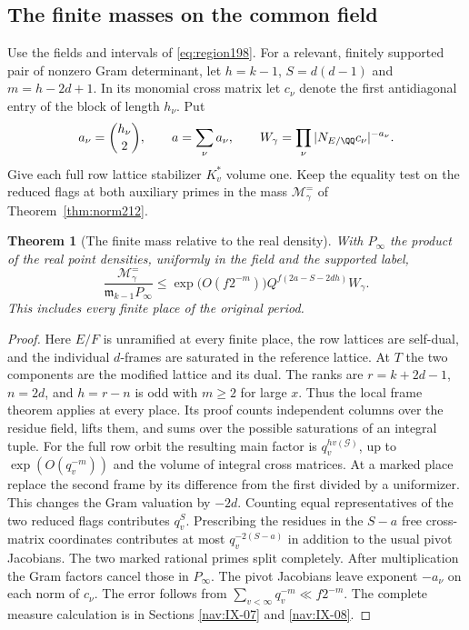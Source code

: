\documentclass[a4paper,11pt]{article}
\newtheorem{theorem}[proposition]{Theorem}
\theoremstyle{definition}
\theoremstyle{remark}
\numberwithin{equation}{section}
\begin{document}
\subsection{The finite masses on the common field}\label{nav:IX-23}
Use the fields and intervals of \eqref{eq:region198}. For a
relevant, finitely supported pair of nonzero Gram determinant,
let \(h=k-1\), \(S=d(d-1)\) and \(m=h-2d+1\). In its monomial
cross matrix let \(c_\nu\) denote the first antidiagonal
entry of the block of length \(h_\nu\). Put
\[
 a_\nu=\binom{h_\nu}{2},\qquad a=\sum_\nu a_\nu,\qquad
 W_\gamma=\prod_\nu |N_{E/\QQ}c_\nu|^{-a_\nu}.
\]
Give each full row lattice stabilizer \(K_v^*\) volume one. Keep
the equality test on the reduced flags at both auxiliary primes
in the mass \(\mathcal M_\gamma^{=}\) of
Theorem~\ref{thm:norm212}.

\begin{theorem}[The finite mass relative to the real density]
\label{thm:finite216}
With \(P_\infty\) the product of the real point densities,
uniformly in the field and the supported label,
\[
 \frac{\mathcal M_\gamma^{=}}{\mathfrak m_{k-1}P_\infty}
   \le \exp\bigl(O(f2^{-m})\bigr)
                    Q^{f(2a-S-2dh)}W_\gamma .
\]
This includes every finite place of the original period.
\end{theorem}
\begin{proof}
Here \(E/F\) is unramified at every finite place, the row
lattices are self-dual, and the individual \(d\)-frames are
saturated in the reference lattice. At \(T\) the two components
are the modified lattice and its dual. The ranks are
\(r=k+2d-1\), \(n=2d\), and \(h=r-n\) is odd with \(m\ge2\)
for large \(x\). Thus the local frame theorem applies at every
place. Its proof counts independent columns over the residue
field, lifts them, and sums over the possible saturations of
an integral tuple. For the full row orbit the resulting main
factor is \(q_v^{h v(\mathcal G)}\), up to
\(\exp(O(q_v^{-m}))\) and the volume of integral cross matrices.
At a marked place replace the second frame by its difference
from the first divided by a uniformizer. This changes the
Gram valuation by \(-2d\). Counting equal representatives of
the two reduced flags contributes \(q_v^S\). Prescribing the
residues in the \(S-a\) free cross-matrix coordinates contributes
at most \(q_v^{-2(S-a)}\) in addition to the usual pivot
Jacobians. The two marked rational primes split completely.
After multiplication the Gram factors cancel those in \(P_\infty\).
The pivot Jacobians leave exponent \(-a_\nu\) on each norm of
\(c_\nu\). The error follows from
\(\sum_{v<\infty}q_v^{-m}\ll f2^{-m}\). The complete measure
calculation is in
Sections \ref{nav:IX-07} and \ref{nav:IX-08}.
\end{proof}
\end{document}
